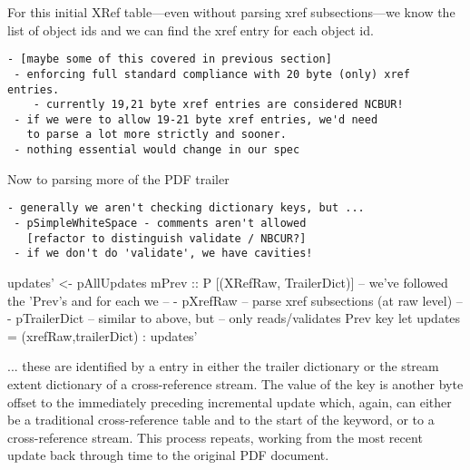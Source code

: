 For this initial XRef table---even without parsing xref subsections---we
know the list of object ids and we can find the xref entry for each object id.

\begin{lstlisting}[style=meta]
 - [maybe some of this covered in previous section]
 - enforcing full standard compliance with 20 byte (only) xref entries.
    - currently 19,21 byte xref entries are considered NCBUR!
 - if we were to allow 19-21 byte xref entries, we'd need
   to parse a lot more strictly and sooner.
 - nothing essential would change in our spec
\end{lstlisting}

Now to parsing more of the PDF trailer

\begin{lstlisting}[style=meta]
 - generally we aren't checking dictionary keys, but ...
 - pSimpleWhiteSpace - comments aren't allowed
   [refactor to distinguish validate / NBCUR?]
 - if we don't do 'validate', we have cavities!
\end{lstlisting}


\begin{code}
    updates' <- pAllUpdates mPrev :: P [(XRefRaw, TrailerDict)]
       -- we've followed the 'Prev's and for each we
       --   - pXrefRaw     -- parse xref subsections (at raw level)
       --   - pTrailerDict -- similar to above, but
       --                     only reads/validates Prev key
    let updates = (xrefRaw,trailerDict) : updates'
\end{code}

... these are identified by a  entry in either the trailer
dictionary or the stream extent dictionary of a cross-reference stream. The
value of the  key is another byte offset to the immediately
preceding incremental update which, again, can either be a traditional
cross-reference table and to the start of the  keyword, or to a
cross-reference stream. This process repeats, working from the most recent
update back through time to the original PDF document.

